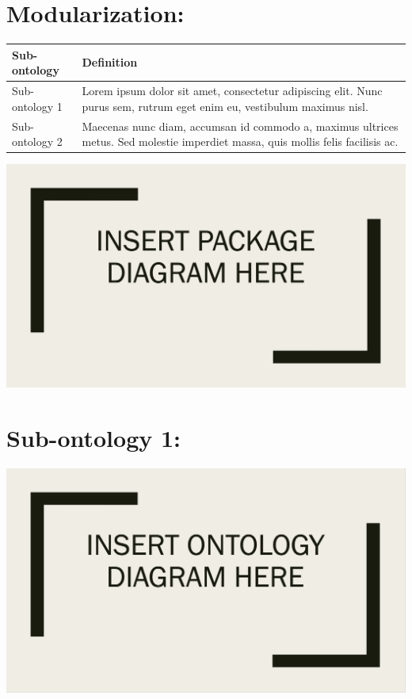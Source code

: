 \documentclass[table,usenames,dvipsnames]{article}
\begin{document}
\section{Modularization:}
\label{sec-modularization}

\begin{center}
	\begin{small}
		\begin{longtable}{ p{30mm} p{130mm} }
			\hline
			\textbf{Sub-ontology} & \textbf{Definition} \\\hline
			
			Sub-ontology 1
				& Lorem ipsum dolor sit amet, consectetur adipiscing elit. Nunc purus sem, rutrum eget enim eu, vestibulum maximus nisl.
				\\\hline
			
			Sub-ontology 2
				& Maecenas nunc diam, accumsan id commodo a, maximus ultrices metus. Sed molestie imperdiet massa, quis mollis felis facilisis ac.
				\\\hline
		\end{longtable}
	\end{small}
\end{center}

\begin{center}
	\includegraphics[width=.85\textwidth]{figures/fig-modularization}	
\end{center}



\section{Sub-ontology 1:}
\label{sec-sub1}

\begin{center}
	\includegraphics[width=.85\textwidth]{figures/fig-ontology}	
\end{center}
\end{document}
